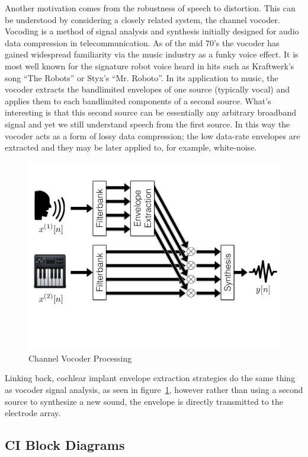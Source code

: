 \documentclass [11pt, proquest] {uwthesis}[2015/03/03]
\begin{document}
Another motivation comes from the robustness of speech to distortion.  This can be understood by considering a closely related system, the channel vocoder.  Vocoding is a method of signal analysis and synthesis initially designed for audio data compression in telecommunication.  As of the mid 70's the vocoder has gained widespread familiarity via the music industry as a funky voice effect.  It is most well known for the signature robot voice heard in hits such as Kraftwerk's song ``The Robots'' or Styx's ``Mr. Roboto''.  In its application to music, the vocoder extracts the bandlimited envelopes of one source (typically vocal) and applies them to each bandlimited components of a second source.  What's interesting is that this second source can be essentially any arbitrary broadband signal and yet we still understand speech from the first source.  In this way the vocoder acts as a form of lossy data compression; the low data-rate envelopes are extracted and they may be later applied to, for example, white-noise.

\begin{figure}[!ht]
  \centering
    \includegraphics[width=.75\textwidth]{vocoder}   
    \caption{Channel Vocoder Processing}\label{fig:vocoder}
\end{figure}

Linking back, cochlear implant envelope extraction strategies do the same thing as vocoder signal analysis, as seen in figure~\ref{fig:vocoder}, however rather than using a second source to synthesize a new sound, the envelope is directly transmitted to the electrode array.

\subsection{CI Block Diagrams}
\end{document}
